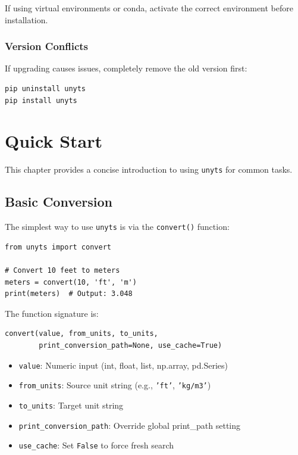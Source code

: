 \documentclass[11pt,a4paper]{report}
\begin{document}
If using virtual environments or conda, activate the correct environment before installation.

\subsection{Version Conflicts}

If upgrading causes issues, completely remove the old version first:
\begin{lstlisting}[style=bashstyle]
pip uninstall unyts
pip install unyts
\end{lstlisting}


\chapter{Quick Start}

This chapter provides a concise introduction to using \texttt{unyts} for common tasks.

\section{Basic Conversion}

The simplest way to use \texttt{unyts} is via the \texttt{convert()} function:

\begin{lstlisting}[style=pythonstyle]
from unyts import convert

# Convert 10 feet to meters
meters = convert(10, 'ft', 'm')
print(meters)  # Output: 3.048
\end{lstlisting}

The function signature is:
\begin{lstlisting}[style=pythonstyle]
convert(value, from_units, to_units, 
        print_conversion_path=None, use_cache=True)
\end{lstlisting}

\begin{itemize}[leftmargin=*]
  \item \texttt{value}: Numeric input (int, float, list, np.array, pd.Series)
  \item \texttt{from\_units}: Source unit string (e.g., \texttt{'ft'}, \texttt{'kg/m3'})
  \item \texttt{to\_units}: Target unit string
  \item \texttt{print\_conversion\_path}: Override global print\_path setting
  \item \texttt{use\_cache}: Set \texttt{False} to force fresh search
\end{itemize}
\end{document}
